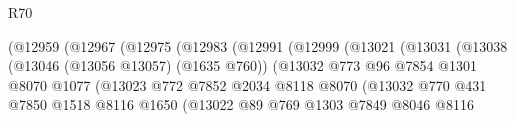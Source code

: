 \begin{lexlean}{R70}
\begin{coremodule}
                                            (@12959
                                              (@12967
                                                (@12975
                                                  (@12983
                                                    (@12991
                                                      (@12999
                                                        (@13021
                                                          (@13031
                                                            (@13038
                                                              (@13046 (@13056 @13057) (@1635 @760))
                                                              (@13032
                                                                @773
                                                                @96
                                                                @7854
                                                                @1301
                                                                @8070
                                                                @1077
                                                                (@13023
                                                                  @772
                                                                  @7852
                                                                  @2034
                                                                  @8118
                                                                  @8070
                                                                  (@13032
                                                                    @770
                                                                    @431
                                                                    @7850
                                                                    @1518
                                                                    @8116
                                                                    @1650
                                                                    (@13022
                                                                      @89
                                                                      @769
                                                                      @1303
                                                                      @7849
                                                                      @8046
                                                                      @8116

\end{coremodule}
\end{lexlean}
